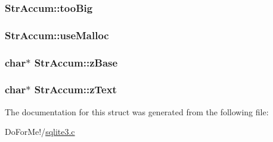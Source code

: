 \hypertarget{struct_str_accum_ae5b62e58c33302b44fedf0e204757ced}{
\subsubsection[{too\-Big}]{ Str\-Accum\-::too\-Big}}\label{struct_str_accum_ae5b62e58c33302b44fedf0e204757ced}
\hypertarget{struct_str_accum_abc135ceee2e63f41c101aceca5e9417b}{
\subsubsection[{use\-Malloc}]{ Str\-Accum\-::use\-Malloc}}\label{struct_str_accum_abc135ceee2e63f41c101aceca5e9417b}
\hypertarget{struct_str_accum_a5797e2f288573ee98a4025f0f96fe50d}{
\subsubsection[{z\-Base}]{\setlength{\rightskip}{0pt plus 5cm}char$\ast$ Str\-Accum\-::z\-Base}}\label{struct_str_accum_a5797e2f288573ee98a4025f0f96fe50d}
\hypertarget{struct_str_accum_ac45a51cb7b85da2ae9865eac21d416dc}{
\subsubsection[{z\-Text}]{\setlength{\rightskip}{0pt plus 5cm}char$\ast$ Str\-Accum\-::z\-Text}}\label{struct_str_accum_ac45a51cb7b85da2ae9865eac21d416dc}


The documentation for this struct was generated from the following file\-:\begin{DoxyCompactItemize}
\item 
Do\-For\-Me!/\hyperlink{sqlite3_8c}{sqlite3.\-c}\end{DoxyCompactItemize}
